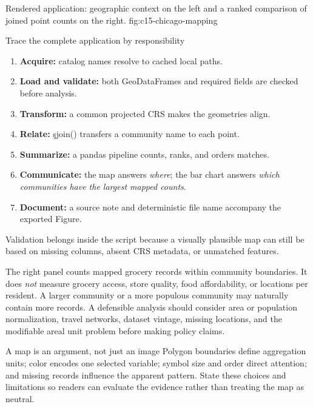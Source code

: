 {Rendered application: geographic context on the left and a ranked comparison of joined point counts on the right.}
{fig:c15-chicago-mapping}

\begin{SyntaxBox}{Trace the complete application by responsibility}
\begin{enumerate}
    \item \textbf{Acquire:} catalog names resolve to cached local paths.
    \item \textbf{Load and validate:} both GeoDataFrames and required fields are
          checked before analysis.
    \item \textbf{Transform:} a common projected CRS makes the geometries align.
    \item \textbf{Relate:} \c{sjoin()} transfers a community name to each point.
    \item \textbf{Summarize:} a pandas pipeline counts, ranks, and orders matches.
    \item \textbf{Communicate:} the map answers \emph{where}; the bar chart answers
          \emph{which communities have the largest mapped counts}.
    \item \textbf{Document:} a source note and deterministic file name accompany
          the exported Figure.
\end{enumerate}
Validation belongs inside the script because a visually plausible map can still
be based on missing columns, absent CRS metadata, or unmatched features.
\end{SyntaxBox}


The right panel counts mapped grocery records within community boundaries. It
does \emph{not} measure grocery access, store quality, food affordability, or
locations per resident. A larger community or a more populous community may
naturally contain more records. A defensible analysis should consider area or
population normalization, travel networks, dataset vintage, missing locations,
and the modifiable areal unit problem before making policy claims.

\begin{ExplainBox}{A map is an argument, not just an image}
Polygon boundaries define aggregation units; color encodes one selected
variable; symbol size and order direct attention; and missing records influence
the apparent pattern. State these choices and limitations so readers can
evaluate the evidence rather than treating the map as neutral.
\end{ExplainBox}

